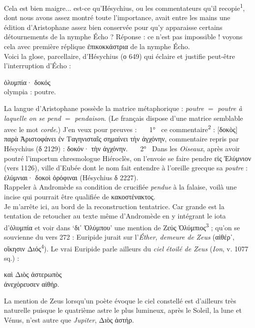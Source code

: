 \documentclass[12pt]{book}%
\newcommand{\italique}[1]{\textit{#1}}%
\newcommand{\citComm}[1]{\begin{quoting}[vskip=0pt] #1 \end{quoting}}%
\newcommand{\marqueur}[1]{\textsuperscript{#1}}%
\newcommand{\eff}[1]{%
{\color{orange}#1}%
}%
\newenvironment{groupe}{%
\pstart%
\ledgroup%
}{%
\pend %
}%
\begin{document}
\begin{pages}
\begin{Leftside}
\begin{groupe}
{{Cela est bien maigre... est-ce qu'Hésychius, ou les commentateurs qu'il recopie\marqueur{1}, dont nous avons assez montré toute l'importance, avait entre les mains une édition d'Aristophane assez bien conservée pour qu'y apparaisse certains détournements de la nymphe Écho ? Réponse : ce n'est pas impossible ! %
voyons cela avec première réplique ἐπικοκκάστρια de la nymphe Écho. \\
Voici la glose, parcellaire, d'Hésychius (ο 649) qui éclaire et justifie peut-être l'interruption d'Écho :%
\citComm{ὀλυμπία· δοκός\\
olympia : poutre.}%
La langue d'Aristophane possède la matrice métaphorique : \italique{poutre} $=$ \italique{poutre à laquelle on se pend} $=$ \italique{pendaison}. (Le français dispose d'une matrice semblable avec le mot \italique{corde}.) J'en veux pour preuves : \ \ \ 1° \ ce commentaire\marqueur{2} : [δοκὸς] παρὰ Ἀριστοφάνει ἐν Ταγηνισταῖς σημαίνει τὴν ἀγχόνην, commentaire repris par Hésychius (δ 2129) : δοκόν· τὴν ἀγχόνην.
\ \ \ 2° \ Dans les \italique{Oiseaux}, après avoir poutré l'importun chresmologue Hiéroclès, on l'envoie se faire pendre εἰς Ἐλύμνιον (vers 1126), ville d'Eubée dont le nom fait entendre à l'oreille grecque sa \italique{poutre} : ἐλύμνιαι· δοκοὶ ὀρόφιναι (Hésychius δ 2227).\\
Rappeler à Andromède sa condition de crucifiée \italique{pendue} à la falaise, voilà une incise qui pourrait être qualifiée de κακοστένακτος.\\
Je m'arrête ici, au bord de la reconstruction tentatrice. Car grande est la tentation de retoucher au texte même d'Andromède en y intégrant le iota d'ὀλυμπία et voir dans `δι᾽ Ὀλύμπου' une mention de Ζεύς Ὀλύμπιος\marqueur{3} ; qu'on se souvienne du vers 272 : Euripide jurait sur l'\italique{Éther, demeure de Zeus} (αἰθέρ᾽, οἴκησιν Διός\marqueur{4}). Le vrai Euripide parle ailleurs du \italique{ciel étoilé de Zeus} (\italique{Ion}, v. 1077 sq.) :%
\citComm{καὶ Διὸς ἀστερωπὸς\\
ἀνεχόρευσεν αἰθήρ.}%
La mention de Zeus lorsqu'un poète évoque le ciel constellé est d'ailleurs très naturelle puisque le quatrième astre le plus lumineux, après le Soleil, la lune et Vénus, n'est autre que \italique{Jupiter}, Διὸς ἀστήρ.
}}
\end{groupe}
\end{Leftside}
\end{pages}
\end{document}
